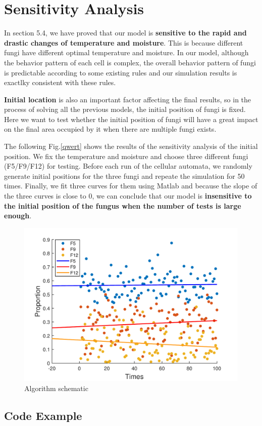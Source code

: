 \documentclass{mcmthesis}
\begin{document}
\section{Sensitivity Analysis}
\par In section 5.4, we have proved that our model is \textbf{sensitive to the rapid and drastic changes of temperature and moisture}. This is because different fungi have different optimal temperature and moisture. In our model, although the behavior pattern of each cell is complex, the overall behavior pattern of fungi is predictable according to some existing rules and our simulation results is exactlky consistent with these rules.
\par \textbf{Initial location} is also an important factor affecting the final results, so in the process of solving all the previous models, the initial position of fungi is fixed. Here we want to test whether the initial position of fungi will have a great impact on the final area occupied by it when there are multiple fungi exists.
\par The following Fig.\eqref{qwert} shows the results of the sensitivity analysis of the initial position. We fix the temperature and moisture and choose three different fungi (F5/F9/F12) for testing. Before each run of the cellular automata, we randomly generate initial positions for the three fungi and repeate the simulation for 50 times. Finally, we fit three curves for them using Matlab and because the slope of the three curves is close to 0, we can conclude that our model is \textbf{insensitive to the initial position of the fungus when the number of tests is large enough}.
\begin{figure}[H] 
	\centering 
	\includegraphics[height=8cm]{./picture/sensitivity.pdf}
	\caption{Algorithm schematic}
	\label{qwert}
\end{figure}

\newpage
\begin{appendices}
\section{Code Example}


\end{appendices}
\end{document}
